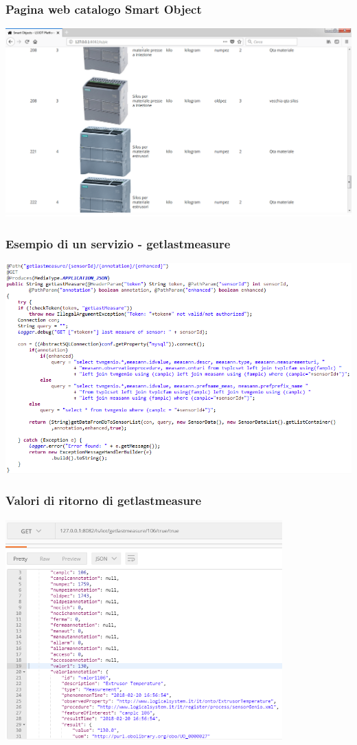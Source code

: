 \documentclass{beamer}
\begin{document}
\begin{frame}
\frametitle{Pagina web catalogo Smart Object}
\includegraphics[width=1\textwidth]{images/SmartObjectsPlatform.png}
\end{frame}

\begin{frame}
\frametitle{Esempio di un servizio - getlastmeasure}
\includegraphics[width=1\textwidth]{images/getlastmeasure.png}
\end{frame}

\begin{frame}
\frametitle{Valori di ritorno di getlastmeasure}
\includegraphics[width=0.8\textwidth]{images/Postman1-corretto.png}
\end{frame}
\end{document}
